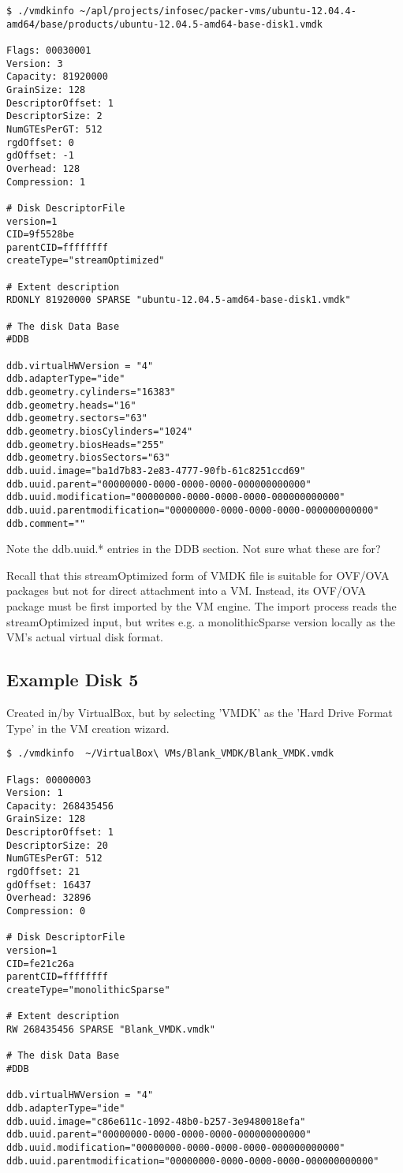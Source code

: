 \documentclass{article}
\begin{document}
\begin{verbatim}
$ ./vmdkinfo ~/apl/projects/infosec/packer-vms/ubuntu-12.04.4-amd64/base/products/ubuntu-12.04.5-amd64-base-disk1.vmdk 

Flags: 00030001
Version: 3
Capacity: 81920000
GrainSize: 128
DescriptorOffset: 1
DescriptorSize: 2
NumGTEsPerGT: 512
rgdOffset: 0
gdOffset: -1
Overhead: 128
Compression: 1

# Disk DescriptorFile
version=1
CID=9f5528be
parentCID=ffffffff
createType="streamOptimized"

# Extent description
RDONLY 81920000 SPARSE "ubuntu-12.04.5-amd64-base-disk1.vmdk"

# The disk Data Base 
#DDB

ddb.virtualHWVersion = "4"
ddb.adapterType="ide"
ddb.geometry.cylinders="16383"
ddb.geometry.heads="16"
ddb.geometry.sectors="63"
ddb.geometry.biosCylinders="1024"
ddb.geometry.biosHeads="255"
ddb.geometry.biosSectors="63"
ddb.uuid.image="ba1d7b83-2e83-4777-90fb-61c8251ccd69"
ddb.uuid.parent="00000000-0000-0000-0000-000000000000"
ddb.uuid.modification="00000000-0000-0000-0000-000000000000"
ddb.uuid.parentmodification="00000000-0000-0000-0000-000000000000"
ddb.comment=""
\end{verbatim}

Note the ddb.uuid.* entries in the DDB section.  Not sure what these
are for?

Recall that this streamOptimized form of VMDK file is suitable for
OVF/OVA packages but not for direct attachment into a VM.  Instead,
its OVF/OVA package must be first imported by the VM engine.  The
import process reads the streamOptimized input, but writes e.g. a
monolithicSparse version locally as the VM's actual virtual disk
format.

\subsection{Example Disk 5}

Created in/by VirtualBox, but by selecting 'VMDK' as the 'Hard Drive
Format Type' in the VM creation wizard.

\begin{verbatim}
$ ./vmdkinfo  ~/VirtualBox\ VMs/Blank_VMDK/Blank_VMDK.vmdk 

Flags: 00000003
Version: 1
Capacity: 268435456
GrainSize: 128
DescriptorOffset: 1
DescriptorSize: 20
NumGTEsPerGT: 512
rgdOffset: 21
gdOffset: 16437
Overhead: 32896
Compression: 0

# Disk DescriptorFile
version=1
CID=fe21c26a
parentCID=ffffffff
createType="monolithicSparse"

# Extent description
RW 268435456 SPARSE "Blank_VMDK.vmdk"

# The disk Data Base 
#DDB

ddb.virtualHWVersion = "4"
ddb.adapterType="ide"
ddb.uuid.image="c86e611c-1092-48b0-b257-3e9480018efa"
ddb.uuid.parent="00000000-0000-0000-0000-000000000000"
ddb.uuid.modification="00000000-0000-0000-0000-000000000000"
ddb.uuid.parentmodification="00000000-0000-0000-0000-000000000000"
\end{verbatim}
\end{document}
